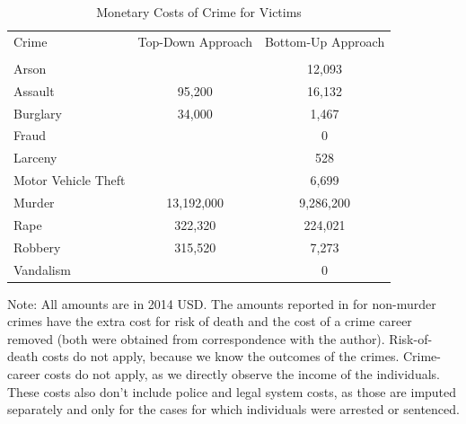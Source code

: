 \documentclass[static]{JJH-Beamer}
\begin{document}
\begin{frame}
 \addtocounter{framenumber}{-1}

\begin{table}[H]
\caption{Monetary Costs of Crime for Victims} \label{tab:individual-crime-cost}
\begin{center}
\begin{tabular}{lcc}
\toprule
Crime				&Top-Down Approach	&Bottom-Up Approach	\\
					& \cite{Cohen_Rust_etal_2004_Criminology}&\cite{McCollister_etal_2010_DAD}\\ \midrule
Arson				&					&12,093			\\
Assault				&95,200			&16,132 			\\
Burglary			&34,000			&1,467 			\\		
Fraud				&				&0				\\
Larceny				&				&528 				\\
Motor Vehicle Theft	&				&6,699 			\\
Murder				&13,192,000		&9,286,200 		\\
Rape				&322,320			&224,021 			\\
Robbery				&315,520			&7,273 			\\
Vandalism			&					&0				\\ \bottomrule
\end{tabular}
\end{center}
\end{table}

\end{frame}

{\flushleft \normalsize Note: All amounts are in 2014 USD. The amounts reported in \cite{McCollister_etal_2010_DAD} for non-murder crimes have the extra cost for risk of death and the cost of a crime career removed (both were obtained from correspondence with the author). Risk-of-death costs do not apply, because we know the outcomes of the crimes. Crime-career costs do not apply, as we directly observe the income of the individuals. These costs also don't include police and legal system costs, as those are imputed separately and only for the cases for which individuals were arrested or sentenced.\\}
\end{document}
